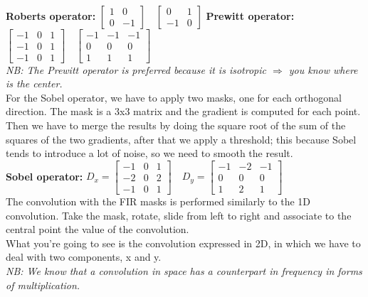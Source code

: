 \\
\textbf{Roberts operator:} $\begin{bmatrix} 1 & 0 \\ 0 & -1 \end{bmatrix} \quad \begin{bmatrix} 0 & 1 \\ -1 & 0 \end{bmatrix}$
\vspace{0.5cm} 
\textbf{Prewitt operator:} $\begin{bmatrix} -1 & 0 & 1 \\ -1 & 0 & 1 \\ -1 & 0 & 1 \end{bmatrix} \quad \begin{bmatrix} -1 & -1 & -1 \\ 0 & 0 & 0 \\ 1 & 1 & 1 \end{bmatrix}$
\\
\textit{NB: The Prewitt operator is preferred because it is isotropic $\Rightarrow$ you know where is the center.}
\\
For the Sobel operator, we have to apply two masks, one for each orthogonal direction. The mask is a 3x3 matrix and the gradient is computed for each point. Then we have to merge the results by doing the square root of the sum of the squares of the two gradients, after that we apply a threshold; this because Sobel tends to introduce a lot of noise, so we need to smooth the result.
\\\vspace{1cm} 
\textbf{Sobel operator:} $D_x=\begin{bmatrix} -1 & 0 & 1 \\ -2 & 0 & 2 \\ -1 & 0 & 1 \end{bmatrix} \quad D_y=\begin{bmatrix} -1 & -2 & -1 \\ 0 & 0 & 0 \\ 1 & 2 & 1 \end{bmatrix}$
\\
The convolution with the FIR masks is performed similarly to the 1D convolution. Take the mask, rotate, slide from left to right and associate to the central point the value of the convolution. 
\\What you're going to see is the convolution expressed in 2D, in which we have to deal with two components, x and y.
\\\textit{NB: We know that a convolution in space has a counterpart in frequency in forms of multiplication.}

